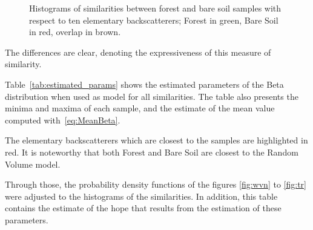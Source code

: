 \documentclass[conference]{IEEEtran}
\begin{document}
\begin{figure}[hbt]
%
%
%
\caption{Histograms of similarities between forest and bare soil samples with respect to ten elementary backscatterers; Forest in green, Bare Soil in red, overlap in brown.}\label{Fig:Histograms}
\end{figure}

The differences are clear, denoting the expressiveness of this measure of similarity.

Table~\ref{tab:estimated_params} shows the estimated parameters of the Beta distribution when used as model for all similarities.
The table also presents the minima and maxima of each sample, and the estimate of the mean value computed with~\eqref{eq:MeanBeta}.

The elementary backscatterers which are closest to the samples are highlighted in red.
It is noteworthy that both Forest and Bare Soil are closest to the Random Volume model.

Through those, the probability density functions of the figures \ref{fig:wvn} to \ref{fig:tr} were adjusted to the histograms of the similarities. In addition, this table contains the estimate of the hope that results from the estimation of these parameters.
\end{document}
